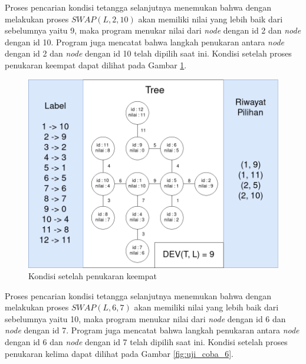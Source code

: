 Proses pencarian kondisi tetangga selanjutnya menemukan bahwa dengan melakukan proses $ SWAP(L, 2, 10) $ akan memiliki nilai yang lebih baik dari sebelumnya yaitu 9, maka program menukar nilai dari \textit{node} dengan id 2 dan \textit{node} dengan id 10. Program juga mencatat bahwa langkah penukaran antara \textit{node} dengan id 2 dan \textit{node} dengan id 10 telah dipilih saat ini. Kondisi setelah proses penukaran keempat dapat dilihat pada Gambar \ref{fig:uji_coba_5}.

\begin{figure}[ht]
	\centering\includegraphics[width=1\textwidth]{bab5/figures/uji_coba_5.png}
	\caption{Kondisi setelah penukaran keempat}
	\label{fig:uji_coba_5}
\end{figure}

Proses pencarian kondisi tetangga selanjutnya menemukan bahwa dengan melakukan proses $ SWAP(L, 6, 7) $ akan memiliki nilai yang lebih baik dari sebelumnya yaitu 10, maka program menukar nilai dari \textit{node} dengan id 6 dan \textit{node} dengan id 7. Program juga mencatat bahwa langkah penukaran antara \textit{node} dengan id 6 dan \textit{node} dengan id 7 telah dipilih saat ini. Kondisi setelah proses penukaran kelima dapat dilihat pada Gambar \ref{fig:uji_coba_6}.

